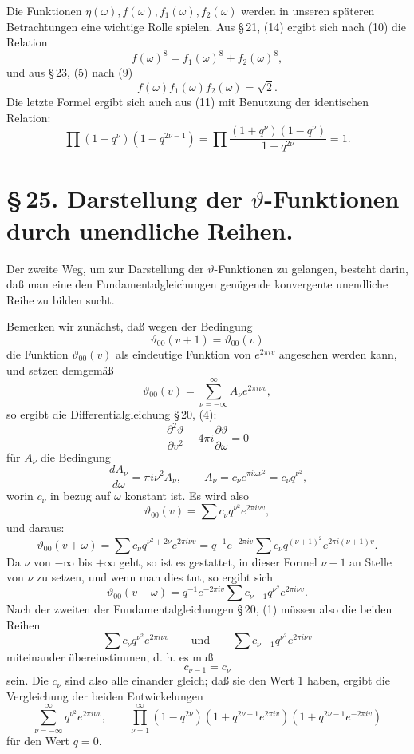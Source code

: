 \documentclass[11pt]{article}
\providecommand{\dd}{\,d}
\providecommand{\tht}{\vartheta}
\begin{document}
Die Funktionen $\eta(\omega),f(\omega),f_1(\omega),f_2(\omega)$ werden in unseren späteren Betrachtungen eine wichtige Rolle spielen. Aus \S\,21, (14) ergibt sich nach (10) die Relation
\begin{equation}
f(\omega)^8=f_1(\omega)^8+f_2(\omega)^8,
\tag{12}
\end{equation}
und aus \S\,23, (5) nach (9)
\begin{equation}
f(\omega)f_1(\omega)f_2(\omega)=\sqrt2.
\tag{13}
\end{equation}
Die letzte Formel ergibt sich auch aus (11) mit Benutzung der identischen Relation:
\[
\prod(1+q^\nu)(1-q^{2\nu-1})=\prod\frac{(1+q^\nu)(1-q^\nu)}{1-q^{2\nu}}=1.
\]

\section*{\S\,25. Darstellung der $\vartheta$-Funktionen durch unendliche Reihen.}

Der zweite Weg, um zur Darstellung der $\vartheta$-Funktionen zu gelangen, besteht darin, daß man eine den Fundamentalgleichungen genügende konvergente unendliche Reihe zu bilden sucht.

Bemerken wir zunächst, daß wegen der Bedingung
\[
\tht_{00}(v+1)=\tht_{00}(v)
\]
die Funktion $\tht_{00}(v)$ als eindeutige Funktion von $e^{2\pi iv}$ angesehen werden kann, und setzen demgemäß
\[
\tht_{00}(v)=\sum_{\nu=-\infty}^{\infty}A_\nu e^{2\pi i\nu v},
\]
so ergibt die Differentialgleichung \S\,20, (4):
\[
\frac{\partial^2\tht}{\partial v^2}-4\pi i\frac{\partial \tht}{\partial \omega}=0
\]
für $A_\nu$ die Bedingung
\[
\frac{\dd A_\nu}{\dd\omega}=\pi i\nu^2A_\nu,
\qquad
A_\nu=c_\nu e^{\pi i\omega\nu^2}=c_\nu q^{\nu^2},
\]
worin $c_\nu$ in bezug auf $\omega$ konstant ist. Es wird also
\[
\tht_{00}(v)=\sum c_\nu q^{\nu^2}e^{2\pi i\nu v},
\]
und daraus:
\[
\tht_{00}(v+\omega)=\sum c_\nu q^{\nu^2+2\nu}e^{2\pi i\nu v}
=q^{-1}e^{-2\pi iv}\sum c_\nu q^{(\nu+1)^2}e^{2\pi i(\nu+1)v}.
\]
Da $\nu$ von $-\infty$ bis $+\infty$ geht, so ist es gestattet, in dieser Formel $\nu-1$ an Stelle von $\nu$ zu setzen, und wenn man dies tut, so ergibt sich
\[
\tht_{00}(v+\omega)=q^{-1}e^{-2\pi iv}\sum c_{\nu-1}q^{\nu^2}e^{2\pi i\nu v}.
\]
Nach der zweiten der Fundamentalgleichungen \S\,20, (1) müssen also die beiden Reihen
\[
\sum c_\nu q^{\nu^2}e^{2\pi i\nu v}\qquad\text{und}\qquad
\sum c_{\nu-1}q^{\nu^2}e^{2\pi i\nu v}
\]
miteinander übereinstimmen, d. h. es muß
\[
c_{\nu-1}=c_\nu
\]
sein. Die $c_\nu$ sind also alle einander gleich; daß sie den Wert 1 haben, ergibt die Vergleichung der beiden Entwickelungen
\[
\sum_{\nu=-\infty}^{\infty}q^{\nu^2}e^{2\pi i\nu v},\qquad
\prod_{\nu=1}^{\infty}(1-q^{2\nu})(1+q^{2\nu-1}e^{2\pi iv})(1+q^{2\nu-1}e^{-2\pi iv})
\]
für den Wert $q=0$.
\end{document}

